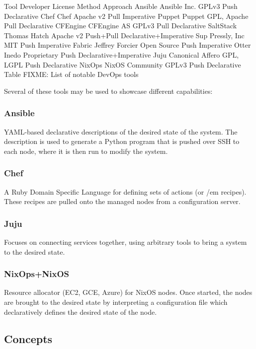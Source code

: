 \documentclass[9pt,twocolumn,twoside]{styles/osajnl}
\begin{document}
Tool
	Developer
	License
	Method
	Approach
	Ansible
	Ansible Inc.
	GPLv3
	Push
	Declarative
	Chef
	Chef
	Apache v2
	Pull
	Imperative
	Puppet
	Puppet
	GPL, Apache
	Pull
	Declarative
	CFEngine
	CFEngine AS
	GPLv3
	Pull
	Declarative
	SaltStack
	Thomas Hatch
	Apache v2
	Push+Pull
	Declarative+Imperative
	Sup
	Pressly, Inc
	MIT
	Push
	Imperative
	Fabric
	Jeffrey Forcier
	Open Source
	Push
	Imperative
	Otter
	Inedo
	Proprietary
	Push
	Declarative+Imperative
	Juju
	Canonical
	Affero GPL, LGPL
	Push
	Declarative
	NixOps
	NixOS Community
	GPLv3
	Push
	Declarative
	Table FIXME: List of notable DevOps tools


Several of these tools may be used to showcase different capabilities:


\subsubsection{Ansible}

YAML-based declarative descriptions of the desired state of the system. The description is used to generate a Python program that is pushed over SSH to each node, where it is then run to modify the system.


\subsubsection{Chef}

A Ruby Domain Specific Language for defining sets of actions (or {/em recipes}). These recipes are pulled onto the managed nodes from a configuration server.


\subsubsection{Juju}

Focuses on connecting services together, using arbitrary tools to bring a system to the desired state.


\subsubsection{NixOps+NixOS}

Resource allocator (EC2, GCE, Azure) for NixOS nodes. Once started, the nodes are brought to the desired state by interpreting a configuration file which declaratively defines the desired state of the node.
\subsection{Concepts}
\end{document}
